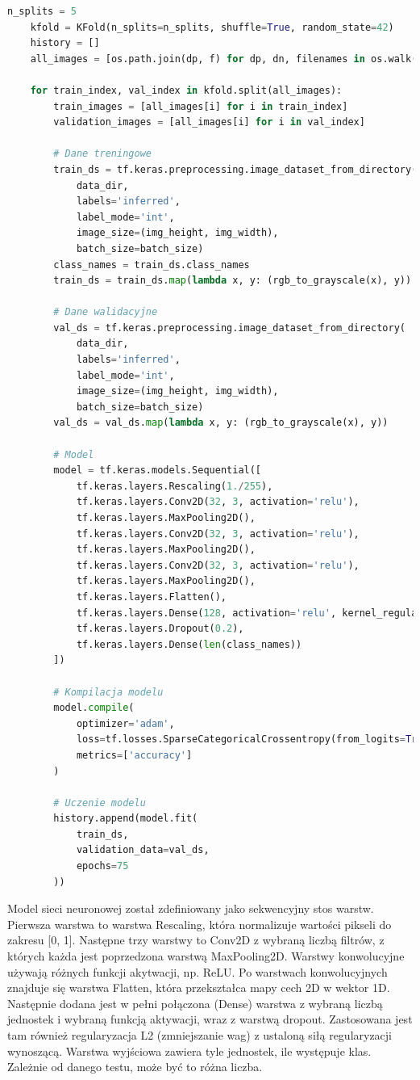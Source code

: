 \begin{lstlisting}[language=Python,caption=Listing jedenego ze skryptów tworzących model,label={tests-model-1}]
	n_splits = 5
	kfold = KFold(n_splits=n_splits, shuffle=True, random_state=42)
	history = []
	all_images = [os.path.join(dp, f) for dp, dn, filenames in os.walk(data_dir) for f in filenames if os.path.splitext(f)[1] == '.png']

	for train_index, val_index in kfold.split(all_images):
		train_images = [all_images[i] for i in train_index]
		validation_images = [all_images[i] for i in val_index]

		# Dane treningowe
		train_ds = tf.keras.preprocessing.image_dataset_from_directory(
			data_dir,
			labels='inferred',
			label_mode='int',
			image_size=(img_height, img_width),
			batch_size=batch_size)
		class_names = train_ds.class_names
		train_ds = train_ds.map(lambda x, y: (rgb_to_grayscale(x), y))

		# Dane walidacyjne
		val_ds = tf.keras.preprocessing.image_dataset_from_directory(
			data_dir,
			labels='inferred',
			label_mode='int',
			image_size=(img_height, img_width),
			batch_size=batch_size)
		val_ds = val_ds.map(lambda x, y: (rgb_to_grayscale(x), y))

		# Model
		model = tf.keras.models.Sequential([
			tf.keras.layers.Rescaling(1./255),
			tf.keras.layers.Conv2D(32, 3, activation='relu'),
			tf.keras.layers.MaxPooling2D(),
			tf.keras.layers.Conv2D(32, 3, activation='relu'),
			tf.keras.layers.MaxPooling2D(),
			tf.keras.layers.Conv2D(32, 3, activation='relu'),
			tf.keras.layers.MaxPooling2D(),
			tf.keras.layers.Flatten(),
			tf.keras.layers.Dense(128, activation='relu', kernel_regularizer=tf.keras.regularizers.l2(0.01)),
			tf.keras.layers.Dropout(0.2),
			tf.keras.layers.Dense(len(class_names))
		])

		# Kompilacja modelu
		model.compile(
			optimizer='adam',
			loss=tf.losses.SparseCategoricalCrossentropy(from_logits=True),
			metrics=['accuracy']
		)

		# Uczenie modelu
		history.append(model.fit(
			train_ds,
			validation_data=val_ds,
			epochs=75
		))
\end{lstlisting}

Model sieci neuronowej został zdefiniowany jako sekwencyjny stos warstw.
Pierwsza warstwa to warstwa Rescaling, która normalizuje wartości pikseli do zakresu [0, 1].
Następne trzy warstwy to Conv2D z wybraną liczbą filtrów, z których każda jest poprzedzona warstwą MaxPooling2D.
Warstwy konwolucyjne używają różnych funkcji akytwacji, np. ReLU.
Po warstwach konwolucyjnych znajduje się warstwa Flatten, która przekształca mapy cech 2D w wektor 1D.
Następnie dodana jest w pełni połączona (Dense) warstwa z wybraną liczbą jednostek
i wybraną funkcją aktywacji, wraz z warstwą dropout.
Zastosowana jest tam również regularyzacja L2 (zmniejszanie wag) z ustaloną siłą regularyzacji wynoszącą.
Warstwa wyjściowa zawiera tyle jednostek, ile występuje klas.
Zależnie od danego testu, może być to różna liczba.

